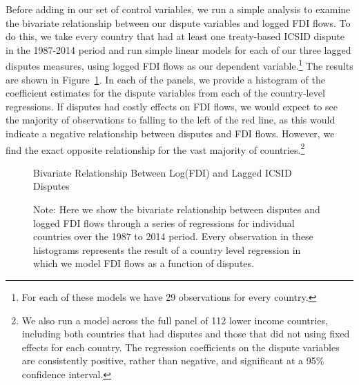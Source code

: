 \documentclass[12pt,onesided]{amsart}
\begin{document}

Before adding in our set of control variables, we run a simple analysis to examine the bivariate relationship between our dispute variables and logged FDI flows. To do this, we take every country that had at least one treaty-based ICSID dispute in the 1987-2014 period and run simple linear models for each of our three lagged disputes measures, using logged FDI flows as our dependent variable.\footnote{For each of these models we have 29 observations for every country.} The results are shown in Figure~\ref{fig:corrFDI}. In each of the panels, we provide a histogram of the coefficient estimates for the dispute variables from each of the country-level regressions. If disputes had costly effects on FDI flows, we would expect to see the majority of observations to falling to the left of the red line, as this would indicate a negative relationship between disputes and FDI flows. However, we find the exact opposite relationship for the vast majority of countries.\footnote{We also run a model across the full panel of 112 lower income countries, including both countries that had disputes and those that did not using fixed effects for each country. The regression coefficients on the dispute variables are consistently positive, rather than negative, and significant at a 95\% confidence interval.}

\begin{figure}[ht]
	\centering
	\caption{Bivariate Relationship Between Log(FDI) and Lagged ICSID Disputes}
	\label{fig:corrFDI}
	\resizebox{1\textwidth}{!}{}	
	\caption*{Note: Here we show the bivariate relationship between disputes and logged FDI flows through a series of regressions for individual countries over the 1987 to 2014 period. Every observation in these histograms represents the result of a country level regression in which we model FDI flows as a function of disputes.}
\end{figure}
\FloatBarrier
\end{document}
